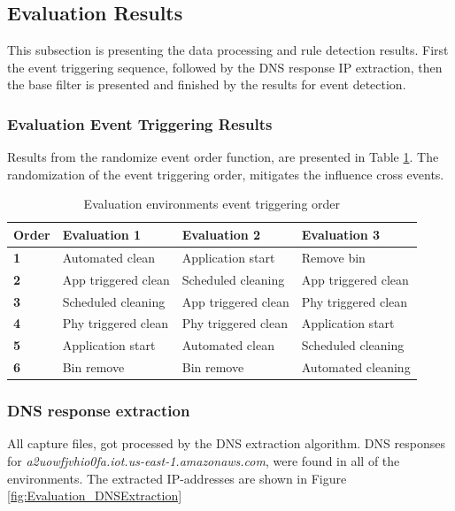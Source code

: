 \subsection{Evaluation Results}

This subsection is presenting the data processing and rule detection results. First the event triggering sequence, followed by the DNS response IP extraction, then the base filter is presented and finished by the results for event detection. 

\subsubsection{Evaluation Event Triggering Results}
Results from the randomize event order function, are presented in Table \ref{tab:evaleventoverview}. The randomization of the event triggering order, mitigates the influence cross events. 

\begin{table}[H]
\small
\centering
\caption{Evaluation environments event triggering order}
\label{tab:evaleventoverview}
\begin{tabular}{|l|l|l|l|}
\hline
\textbf{Order} & \textbf{Evaluation 1}          & \textbf{Evaluation 2}          & \textbf{Evaluation 3}          \\ \hline
\textbf{1}        & Automated clean                & Application start              & Remove bin                     \\ \hline
\textbf{2}        & App triggered clean            & Scheduled cleaning             & App triggered clean            \\ \hline
\textbf{3}        & Scheduled cleaning             & App triggered clean            & Phy triggered clean            \\ \hline
\textbf{4}        & Phy triggered clean            & Phy triggered clean            & Application start              \\ \hline
\textbf{5}        & Application start              & Automated clean                & Scheduled cleaning             \\ \hline
\textbf{6}        & Bin remove                     & Bin remove                     & Automated cleaning             \\ \hline
\end{tabular}
\end{table}

\subsubsection{DNS response extraction}
All capture files, got processed by the DNS extraction algorithm. DNS responses for \textit{a2uowfjvhio0fa.iot.us-east-1.amazonaws.com}, were found in all of the environments. The extracted IP-addresses are shown in Figure \ref{fig:Evaluation_DNSExtraction}

